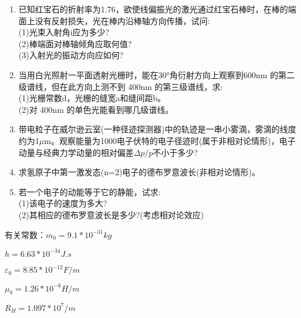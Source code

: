 \begin{enumerate}
(2)若用光栅常数$d=1.0*10^{-3}cm$的光栅替换单缝，其它条件和上一问相同，求相应两个第一级主极大之间的距离。
\item 已知红宝石的折射率为1.76，欲使线偏振光的激光通过红宝石棒时，在棒的端面上没有反射损失，光在棒内沿棒轴方向传播，试问:\\
(1)光束入射角i应为多少?\\
(2)棒端面对棒轴倾角应取何值?\\
(3)入射光的振动方向应如何?
\item 当用白光照射一平面透射光栅时，能在30°角衍射方向上观察到600nm 的第二级谱线，但在此方向上测不到 400nm 的第三级谱线，求:\\
(1)光栅常数d，光栅的缝宽a和缝间距b。\\
(2)对 400nm 的单色光能看到哪几级谱线。
\item 带电粒子在威尔逊云室(一种径迹探测器)中的轨迹是一串小雾滴，雾滴的线度约为1$\mu$m。观察能量为1000电子伏特的电子径迹时(属于非相对论情形)，电子动量与经典力学动量的相对偏差$\Delta p/p$不小于多少?
\item 求氢原子中第一激发态(n=2)电子的德布罗意波长(非相对论情形)。
\item 若一个电子的动能等于它的静能，试求:\\
(1)该电子的速度为多大?\\
(2)其相应的德布罗意波长是多少?(考虑相对论效应)
\end{enumerate}


有关常数：$m_0=9.1*10^{-31}kg$

$h=6.63*10^{-34}J.s$

$\varepsilon_0=8.85*10^{-12}F/m$

$\mu_0=1.26*10^{-6}H/m$

$R_H=1.097*10^7/m$
